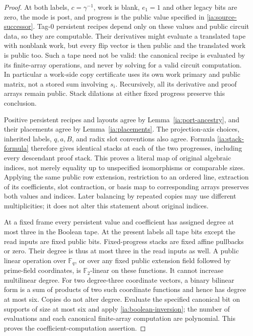 \begin{proof}
At both labels, $c=\gamma^{-1}$, work is blank, $e_1=1$ and other
legacy bits are zero, the mode is post, and progress is the public
value specified in \eqref{ia:source-successor}.  Tag-$0$ persistent
recipes depend only on these values and public circuit data, so
they are computable.  Their derivatives might evaluate a translated
tape with nonblank work, but every flip vector is then public and
the translated work is public too.  Such a tape need not be valid:
the canonical recipe is evaluated by its finite-array operations,
and never by solving for a valid circuit computation.  In
particular a work-side copy certificate uses its own work primary
and public matrix, not a stored sum involving $s_i$.  Recursively,
all its derivative and proof arrays remain public.  Stack
dilations at either fixed progress preserve this conclusion.

Positive persistent recipes and layouts agree by
Lemma~\ref{ia:port-ancestry}, and their placements agree by
Lemma~\ref{ia:placements}.  The projection-axis choices, inherited
labels, $q,a,B$, and radix slot conventions also agree.  Formula
\eqref{ia:stack-formula} therefore gives identical stacks at each
of the two progresses, including every descendant proof stack.
This proves a literal map of original algebraic indices, not
merely equality up to unspecified isomorphisms or comparable sizes.
Applying the same public row extension, restriction to an ordered
line, extraction of its coefficients, slot contraction, or basis
map to corresponding arrays preserves both values and indices.
Later balancing by repeated copies may use different multiplicities;
it does not alter this statement about original indices.

At a fixed frame every persistent value and coefficient has
assigned degree at most three in the Boolean tape.  At the present
labels all tape bits except the read inputs are fixed public bits.
Fixed-progress stacks are fixed affine pullbacks or zero.  Their
degree is thus at most three in the read inputs as well.  A public
linear operation over $\mathbb F_q$, or over any fixed public
extension field followed by prime-field coordinates, is
$\mathbb F_2$-linear on these functions.  It cannot increase
multilinear degree.  For two degree-three coordinate vectors, a
binary bilinear form is a sum of products of two such coordinate
functions and hence has degree at most six.  Copies do not alter
degree.  Evaluate the specified canonical bit on supports of size
at most six and apply \eqref{ia:boolean-inversion}; the number of
evaluations and each canonical finite-array computation are
polynomial.  This proves the coefficient-computation assertion.
\end{proof}

